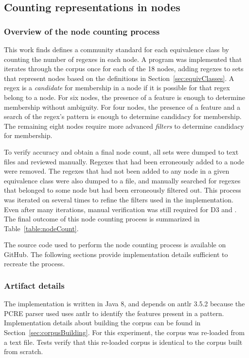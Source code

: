 \subsection{Counting representations in nodes}

\subsubsection{Overview of the node counting process}
\label{sec:nodeCountOverview}
This work finds defines a community standard for each equivalence class by counting the number of regexes in each node.  A program was implemented that iterates through the corpus once for each of the 18 nodes, adding regexes to sets that represent nodes based on the definitions in Section~\ref{sec:equivClasses}.  A regex is a \emph{candidate} for membership in a node if it is possible for that regex belong to a node.  For six nodes, the presence of a feature is enough to determine membership without ambiguity.  For four nodes, the presence of a feature and a search of the regex's pattern is enough to determine candidacy for membership.  The remaining eight nodes require more advanced \emph{filters} to determine candidacy for membership.

To verify accuracy and obtain a final node count, all sets were dumped to text files and reviewed manually. Regexes that had been erroneously added to a node were removed.  The regexes that had not been added to any node in a given equivalence class were also dumped to a file, and manually searched for regexes that belonged to some node but had been erroneously filtered out.  This process was iterated on several times to refine the filters used in the implementation.  Even after many iterations, manual verification was still required for D3 and . The final outcome of this node counting process is summarized in Table~\ref{table:nodeCount}.

The source code used to perform the node counting process is available on GitHub.  The following sections provide implementation details sufficient to recreate the process.

\subsubsection{Artifact details}
The implementation is written in Java 8, and depends on antlr 3.5.2 because the PCRE parser used uses antlr to identify the features present in a pattern.  Implementation details about building the corpus can be found in Section~\ref{sec:corpusBuilding}.  For this experiment, the corpus was re-loaded from a text file.  Tests verify that this re-loaded corpus is identical to the corpus built from scratch.

